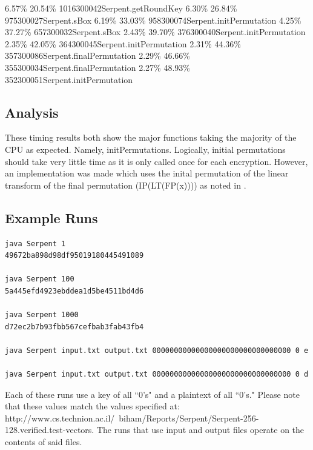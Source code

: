 \documentclass[12pt]{article} %
\newcommand{\tab}{\hspace*{2em}}
\begin{document}
\tab  6.57\tab\% 20.54\tab\%    1016\tab 300042\tab Serpent.getRoundKey
\tab  6.30\tab\% 26.84\tab\%     975\tab 300027\tab Serpent.sBox
\tab  6.19\tab\% 33.03\tab\%     958\tab 300074\tab Serpent.initPermutation
\tab  4.25\tab\% 37.27\tab\%     657\tab 300032\tab Serpent.sBox
\tab  2.43\tab\% 39.70\tab\%     376\tab 300040\tab Serpent.initPermutation
\tab  2.35\tab\% 42.05\tab\%     364\tab 300045\tab Serpent.initPermutation
\tab  2.31\tab\% 44.36\tab\%     357\tab 300086\tab Serpent.finalPermutation
\tab  2.29\tab\% 46.66\tab\%     355\tab 300034\tab Serpent.finalPermutation
\tab  2.27\tab\% 48.93\tab\%     352\tab 300051\tab Serpent.initPermutation
\subsection{Analysis}
These timing results both show the major functions taking the majority of the CPU as expected. Namely, initPermutations. Logically, initial permutations should take very little time as it is only called once for each encryption. However, an implementation was made which uses the inital permutation of the linear transform of the final permutation (IP(LT(FP(x)))) as noted in \cite{SERPENT}.

\subsection{Example Runs}
\begin{lstlisting}
java Serpent 1
49672ba898d98df95019180445491089

java Serpent 100
5a445efd4923ebddea1d5be4511bd4d6

java Serpent 1000
d72ec2b7b93fbb567cefbab3fab43fb4

java Serpent input.txt output.txt 00000000000000000000000000000000 0 e

java Serpent input.txt output.txt 00000000000000000000000000000000 0 d

\end{lstlisting}
Each of these runs use a key of all ``0's" and a plaintext of all ``0's." Please note that these values match the values specified at: http://www.cs.technion.ac.il/~biham/Reports/Serpent/Serpent-256-128.verified.test-vectors.  The runs that use input and output files operate on the contents of said files.
\end{document}
